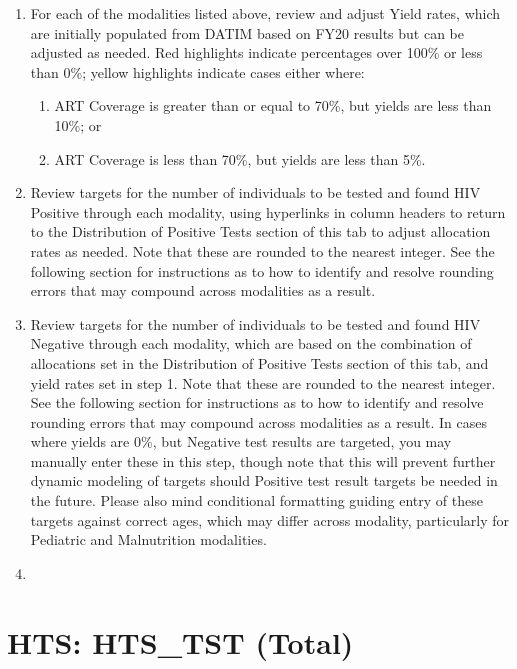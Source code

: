 \documentclass[
  openany]{book}
\begin{document}
\begin{enumerate}
\def\labelenumi{\arabic{enumi}.}
\item
  For each of the modalities listed above, review and adjust Yield
  rates, which are initially populated from DATIM based on FY20
  results but can be adjusted as needed. Red highlights indicate
  percentages over 100\% or less than 0\%; yellow highlights indicate
  cases either where:

  \begin{enumerate}
  \def\labelenumii{\alph{enumii}.}
  \item
    ART Coverage is greater than or equal to 70\%, but yields are
    less than 10\%; or
  \item
    ART Coverage is less than 70\%, but yields are less than 5\%.
  \end{enumerate}
\item
  Review targets for the number of individuals to be tested and found
  HIV Positive through each modality, using hyperlinks in column
  headers to return to the Distribution of Positive Tests section of
  this tab to adjust allocation rates as needed. Note that these are
  rounded to the nearest integer. See the following section for
  instructions as to how to identify and resolve rounding errors that
  may compound across modalities as a result.
\item
  Review targets for the number of individuals to be tested and found
  HIV Negative through each modality, which are based on the
  combination of allocations set in the Distribution of Positive Tests
  section of this tab, and yield rates set in step 1. Note that these
  are rounded to the nearest integer. See the following section for
  instructions as to how to identify and resolve rounding errors that
  may compound across modalities as a result. In cases where yields
  are 0\%, but Negative test results are targeted, you may manually
  enter these in this step, though note that this will prevent further
  dynamic modeling of targets should Positive test result targets be
  needed in the future. Please also mind conditional formatting
  guiding entry of these targets against correct ages, which may
  differ across modality, particularly for Pediatric and Malnutrition
  modalities.
\item
\end{enumerate}

\hypertarget{hts-hts_tst-total}{%
\section{HTS: HTS\_TST (Total)}\label{hts-hts_tst-total}}
\end{document}
